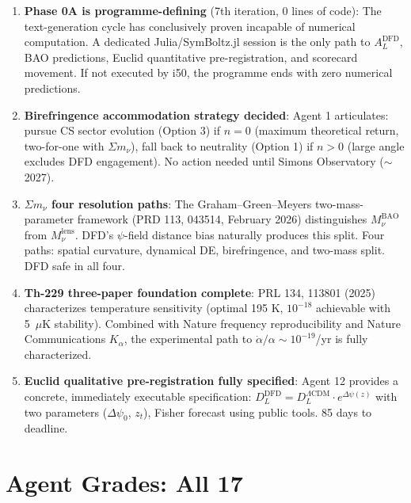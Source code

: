 \documentclass[11pt,a4paper]{article}
\begin{document}
\begin{enumerate}
\item \textbf{Phase 0A is programme-defining} (7th iteration, 0 lines of code): The text-generation cycle has conclusively proven incapable of numerical computation. A dedicated Julia/SymBoltz.jl session is the only path to $A_L^{\text{DFD}}$, BAO predictions, Euclid quantitative pre-registration, and scorecard movement. If not executed by i50, the programme ends with zero numerical predictions.

\item \textbf{Birefringence accommodation strategy decided}: Agent 1 articulates: pursue CS sector evolution (Option 3) if $n = 0$ (maximum theoretical return, two-for-one with $\Sigma m_\nu$), fall back to neutrality (Option 1) if $n > 0$ (large angle excludes DFD engagement). No action needed until Simons Observatory ($\sim$2027).

\item \textbf{$\Sigma m_\nu$ four resolution paths}: The Graham--Green--Meyers two-mass-parameter framework (PRD 113, 043514, February 2026) distinguishes $M_\nu^{\text{BAO}}$ from $M_\nu^{\text{lens}}$. DFD's $\psi$-field distance bias naturally produces this split. Four paths: spatial curvature, dynamical DE, birefringence, and two-mass split. DFD safe in all four.

\item \textbf{Th-229 three-paper foundation complete}: PRL 134, 113801 (2025) characterizes temperature sensitivity (optimal 195 K, $10^{-18}$ achievable with 5~$\mu$K stability). Combined with Nature frequency reproducibility and Nature Communications $K_\alpha$, the experimental path to $\dot{\alpha}/\alpha \sim 10^{-19}$/yr is fully characterized.

\item \textbf{Euclid qualitative pre-registration fully specified}: Agent 12 provides a concrete, immediately executable specification: $D_L^{\text{DFD}} = D_L^{\Lambda\text{CDM}} \cdot e^{\Delta\psi(z)}$ with two parameters ($\Delta\psi_0$, $z_t$), Fisher forecast using public tools. 85 days to deadline.
\end{enumerate}


\part{Agent Grades: All 17}
\end{document}
